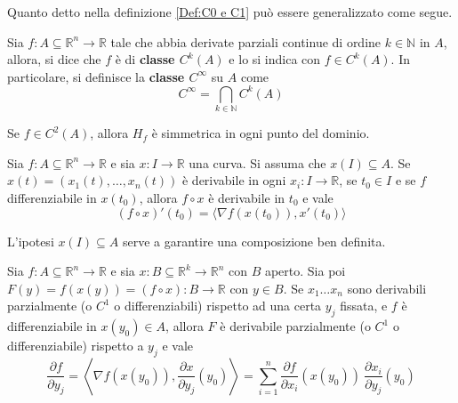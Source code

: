Quanto detto nella definizione \ref{Def:C0 e C1} può essere generalizzato come segue.
\begin{definition} \label{Def: Ck}
    Sia $f:A \subseteq \mathbb{R}^n\to \mathbb{R}$ tale che abbia derivate parziali continue di ordine $k \in \mathbb{N}$ in $A$, allora, si dice che $f$ è di \textbf{classe $C^k(A)$} e lo si indica con $f \in C^k(A)$.
    In particolare, si definisce la \textbf{classe $C^\infty$} su $A$ come
    \begin{equation}
      C^\infty= \bigcap_{k \in \mathbb{N}}{C^k(A)}
    \end{equation}
\end{definition}
\begin{corollary}
    Se $f \in C^2(A)$, allora $H_f$ è simmetrica in ogni punto del dominio.
\end{corollary}
\begin{theorem} \label{Teo: Derivata composta 1}
    Sia $f:A \subseteq \mathbb{R}^n \to \mathbb{R}$ e sia $x: I \to \mathbb{R}$ una curva. Si assuma che $x(I) \subseteq A$. Se $x(t)=(x_1(t), \dots, x_n(t))$ è derivabile in ogni $x_i:I \to \mathbb{R}$, se $t_0 \in I$ e se $f$ differenziabile in $x(t_0)$, allora
    $f \circ x$ è derivabile in $t_0$ e vale
    \begin{equation}
        (f \circ x)'(t_0)= \langle \nabla f(x(t_0)), x'(t_0) \rangle \label{Eq: Derivata composta 1}
    \end{equation}
\begin{oss}
    L'ipotesi $x(I) \subseteq A$ serve a garantire una composizione ben definita.
\end{oss}
\end{theorem}
\begin{theorem} \label{Teo: Derivata composta 2}
    Sia $f:A \subseteq \mathbb{R}^n \to \mathbb{R}$ e sia $x: B \subseteq \mathbb{R}^k \to \mathbb{R}^n$ con $B$ aperto. Sia poi $F(y)=f(x(y))=(f \circ x): B \to \mathbb{R}$ con $y \in B$. Se $x_1 \dots x_n$ sono derivabili parzialmente (o $C^1$ o differenziabili) rispetto ad una certa $y_j$ fissata, e $f$ è differenziabile in $x(y_0) \in A$, allora $F$ è derivabile parzialmente (o $C^1$ o differenziabile) rispetto a $y_j$ e vale 
    \begin{equation} \label{Eq: Derivata composta 2}
        \frac{\partial f}{\partial y_j}=\left\langle \nabla f(x(y_0)), \frac{\partial x}{\partial y_j}(y_0)\right\rangle=\sum\limits_{i=1}^{n}{\frac{\partial f}{\partial x_i}(x(y_0))\ \frac{\partial x_i}{\partial y_j}(y_0)}
    \end{equation}    
\end{theorem}
